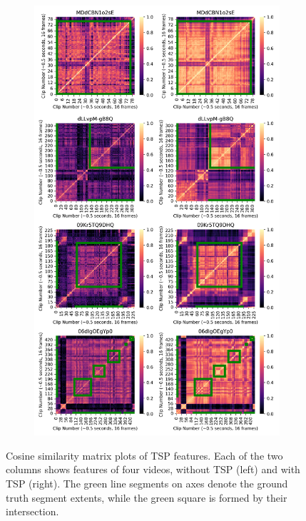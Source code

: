 \begin{figure}[h]
\begin{subfigure}[b]{0.45\textwidth}
        \includegraphics[width=\linewidth]{assets/img/tsp/tsp-viz-2.png}
    \end{subfigure}
    \caption{Cosine similarity matrix plots of TSP features. Each of the two columns shows features of four videos, without TSP (left) and with TSP (right). The green line segments on axes denote the ground truth segment extents, while the green square is formed by their intersection.}

	\label{fig:tsp-feats}
\end{figure}

